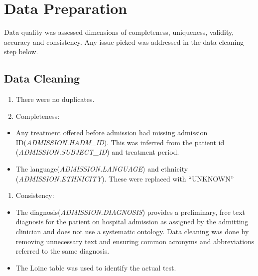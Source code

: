 \documentclass[
]{article}
\providecommand{\tightlist}{%
  \setlength{\itemsep}{0pt}\setlength{\parskip}{0pt}}
\begin{document}
\hypertarget{data-preparation}{%
\section{Data Preparation}\label{data-preparation}}

Data quality was assessed dimensions of completeness, uniqueness,
validity, accuracy and consistency. Any issue picked was addressed in
the data cleaning step below.

\hypertarget{data-cleaning}{%
\subsection{Data Cleaning}\label{data-cleaning}}

\begin{enumerate}
\def\labelenumi{\arabic{enumi}.}
\tightlist
\item
  There were no duplicates.
\item
  Completeness:
\end{enumerate}

\begin{itemize}
\tightlist
\item
  Any treatment offered before admission had missing admission
  ID(\emph{ADMISSION.HADM\_ID}). This was inferred from the patient id
  (\emph{ADMISSION.SUBJECT\_ID}) and treatment period.
\item
  The language(\emph{ADMISSION.LANGUAGE}) and ethnicity
  (\emph{ADMISSION.ETHNICITY}). These were replaced with ``UNKNOWN''
\end{itemize}

\begin{enumerate}
\def\labelenumi{\arabic{enumi}.}
\setcounter{enumi}{2}
\tightlist
\item
  Consistency:
\end{enumerate}

\begin{itemize}
\tightlist
\item
  The diagnosis(\emph{ADMISSION.DIAGNOSIS}) provides a preliminary, free
  text diagnosis for the patient on hospital admission as assigned by
  the admitting clinician and does not use a systematic ontology. Data
  cleaning was done by removing unnecessary text and ensuring common
  acronyms and abbreviations referred to the same diagnosis.
\item
  The Loinc table was used to identify the actual test.
\end{itemize}
\end{document}
